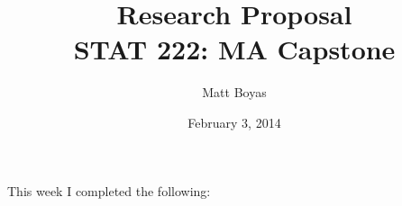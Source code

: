 \documentclass{article}
\begin{document}
\title{Research Proposal\\STAT 222: MA Capstone}
\author{Matt Boyas}

\date{February 3, 2014}
\maketitle
This week I completed the following:
\begin{enumerate}
\end{enumerate}
\end{document}
